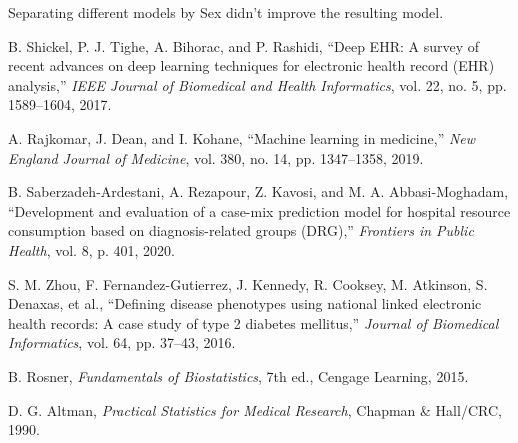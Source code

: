\documentclass{ieeeaccess}
\begin{document}
Separating different models by Sex didn't improve the resulting model.


\begin{thebibliography}{99}

B. Shickel, P. J. Tighe, A. Bihorac, and P. Rashidi, ``Deep EHR: A survey of recent advances on deep learning techniques for electronic health record (EHR) analysis,'' \textit{IEEE Journal of Biomedical and Health Informatics}, vol. 22, no. 5, pp. 1589--1604, 2017.

A. Rajkomar, J. Dean, and I. Kohane, ``Machine learning in medicine,'' \textit{New England Journal of Medicine}, vol. 380, no. 14, pp. 1347--1358, 2019.

B. Saberzadeh-Ardestani, A. Rezapour, Z. Kavosi, and M. A. Abbasi-Moghadam, ``Development and evaluation of a case-mix prediction model for hospital resource consumption based on diagnosis-related groups (DRG),'' \textit{Frontiers in Public Health}, vol. 8, p. 401, 2020.

S. M. Zhou, F. Fernandez-Gutierrez, J. Kennedy, R. Cooksey, M. Atkinson, S. Denaxas, et al., ``Defining disease phenotypes using national linked electronic health records: A case study of type 2 diabetes mellitus,'' \textit{Journal of Biomedical Informatics}, vol. 64, pp. 37--43, 2016.

B. Rosner, \textit{Fundamentals of Biostatistics}, 7th ed., Cengage Learning, 2015.

D. G. Altman, \textit{Practical Statistics for Medical Research}, Chapman & Hall/CRC, 1990.

\end{thebibliography}



\EOD
\end{document}
